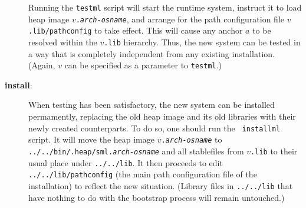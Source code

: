 \begin{description}
Running the {\tt testml} script will start the runtime system,
instruct it to load heap image {\tt $v$.{\it arch}-{\it osname}},
and arrange for the path configuration file {\tt $v$.lib/pathconfig}
to take effect.  This will cause any anchor $a$ to be resolved within
the {\tt $v$.lib} hierarchy.  Thus, the new system can be tested in a
way that is completely independent from any existing installation.
(Again, $v$ can be specified as a parameter to {\tt testml}.)
\item[{\bf install}:]
When testing has been satisfactory, the new system can be installed
permamently, replacing the old heap image and its old libraries with
their newly created counterparts.  To do so, one should run the {\tt
installml} script.  It will move the heap image
{\tt $v$.{\it arch}-{\it osname}} to
{\tt ../../bin/.heap/sml.{\it arch}-{\it osname}}
and all stablefiles from {\tt $v$.lib} to their usual place
under {\tt ../../lib}.  It then proceeds to edit
{\tt ../../lib/pathconfig} (the main path configuration file of the
installation) to reflect the new situation.
(Library files in {\tt ../../lib} that have nothing to do with the
bootstrap process will remain untouched.)
\end{description}
